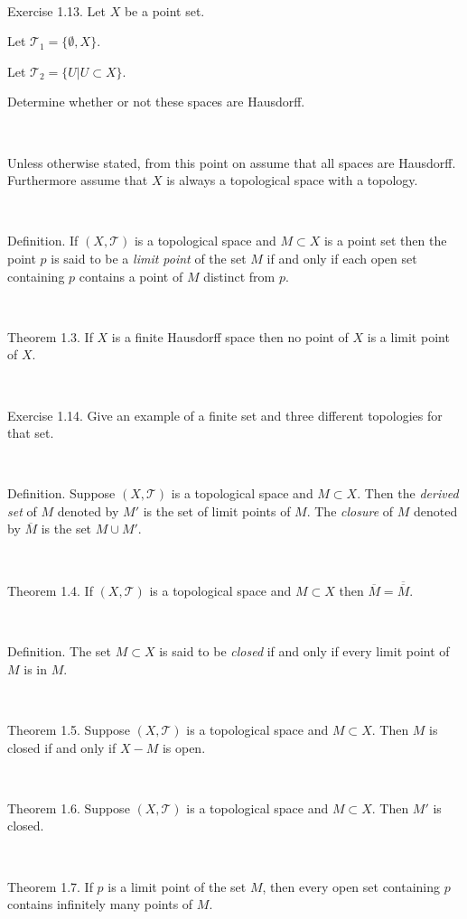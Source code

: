 \documentclass[12pt, std]{article}
\begin{document}
\

Exercise 1.13.  Let $X$ be a point set.

\qquad Let $\mathcal{T}_1 = \{ \emptyset, X \}$.

\qquad Let $\mathcal{T}_2 = \{U | U \subset X \}$.

Determine whether or not these spaces are Hausdorff.

\

Unless otherwise stated, from this point on assume that all spaces
are Hausdorff.  Furthermore assume that $X$ is always a topological
space with a topology.

\

Definition.  If $(X, \mathcal{T})$ is a topological space and $M
\subset X$ is a point set then the point $p$ is said to be a
\textit{limit point} of the set $M$ if and only if each open set
containing $p$ contains a point of $M$ distinct from $p$.

\

Theorem 1.3.  If $X$ is a finite Hausdorff space then no point of
$X$ is a limit point of $X$.

\

Exercise 1.14.  Give an example of a finite set and three different topologies for that set.

\

Definition.   Suppose $(X, \mathcal{T})$ is a topological space and
$M \subset X$.  Then the \textit{derived set} of $M$ denoted by $M'$
is the set of limit points of $M$.  The \textit{closure} of $M$
denoted by $\overline{M}$ is the set $M \cup M'$.

\

Theorem 1.4.  If $(X, \mathcal{T})$ is a topological space and $M
\subset X$ then $\overline{M} = \overline{\overline{M}}$.

\

Definition.  The set $M \subset X$ is said to be \textit{closed} if
and only if every limit point of $M$ is in $M$.

\

Theorem 1.5.  Suppose $(X, \mathcal{T})$ is a topological space and
$M \subset X$.  Then $M$ is closed if and only if $X-M$ is open.

\

Theorem 1.6.  Suppose $(X, \mathcal{T})$ is a topological space and
$M \subset X$.  Then $M'$ is closed.

\

Theorem 1.7.  If $p$ is a limit point of the set $M$, then every
open set containing $p$ contains infinitely many points of $M$.
\end{document}
